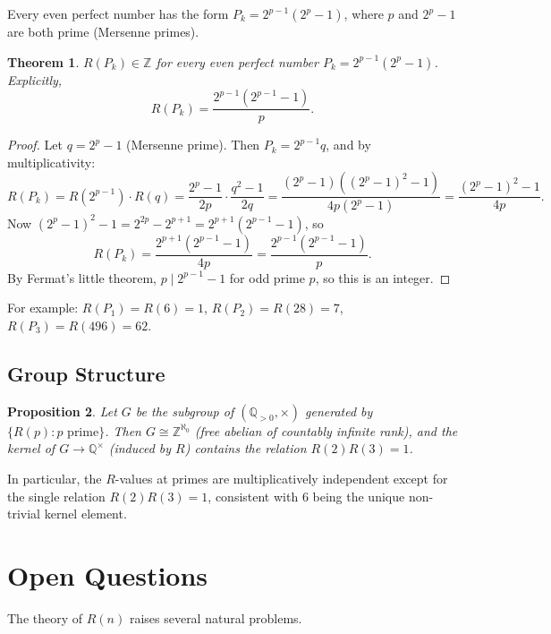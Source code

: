 \documentclass[12pt]{article}
\newtheorem{theorem}{Theorem}[section]
\newtheorem{proposition}[theorem]{Proposition}
\newcommand{\Z}{\mathbb{Z}}
\newcommand{\Q}{\mathbb{Q}}
\begin{document}
Every even perfect number has the form $P_k = 2^{p-1}(2^p-1)$, where $p$ and
$2^p-1$ are both prime (Mersenne primes).

\begin{theorem}\label{thm:perfect}
$R(P_k)\in\Z$ for every even perfect number $P_k=2^{p-1}(2^p-1)$.
Explicitly,
\[
  R(P_k) = \frac{2^{p-1}(2^{p-1}-1)}{p}.
\]
\end{theorem}

\begin{proof}
Let $q=2^p-1$ (Mersenne prime).  Then $P_k=2^{p-1}q$, and by multiplicativity:
\[
  R(P_k) = R(2^{p-1})\cdot R(q)
  = \frac{2^p-1}{2p}\cdot\frac{q^2-1}{2q}
  = \frac{(2^p-1)((2^p-1)^2-1)}{4p(2^p-1)}
  = \frac{(2^p-1)^2-1}{4p}.
\]
Now $(2^p-1)^2-1 = 2^{2p}-2^{p+1}=2^{p+1}(2^{p-1}-1)$, so
\[
  R(P_k) = \frac{2^{p+1}(2^{p-1}-1)}{4p} = \frac{2^{p-1}(2^{p-1}-1)}{p}.
\]
By Fermat's little theorem, $p\mid 2^{p-1}-1$ for odd prime $p$, so this is
an integer.
\end{proof}

\noindent For example: $R(P_1)=R(6)=1$, $R(P_2)=R(28)=7$,
$R(P_3)=R(496)=62$.

\subsection{Group Structure}

\begin{proposition}\label{prop:group}
Let $G$ be the subgroup of $(\Q_{>0},\times)$ generated by $\{R(p) : p\text{ prime}\}$.
Then $G\cong \Z^{\aleph_0}$ (free abelian of countably infinite rank), and the
kernel of $G\to\Q^\times$ (induced by $R$) contains the relation $R(2)R(3)=1$.
\end{proposition}

In particular, the $R$-values at primes are multiplicatively independent except
for the single relation $R(2)R(3)=1$, consistent with $6$ being the unique
non-trivial kernel element.

\section{Open Questions}
\label{sec:questions}

The theory of $R(n)$ raises several natural problems.
\end{document}
